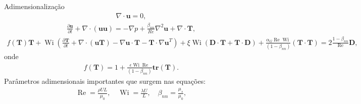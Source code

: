 \begin{frame}{Adimensionalização}
\begin{equation}
    \begin{split}
        \nabla \cdot \mathbf{u} = 0,
    \end{split}\label{eq_conservacao_massa_admensional}
\end{equation}
\begin{equation}
    \begin{split}
        \frac{\partial \mathbf{u}}{\partial t} + \nabla \cdot (\mathbf{uu}) = -\nabla p + \frac{\beta_{nn}}{Re} \nabla^2 \mathbf{u} + \nabla \cdot \mathbf{T},
\end{split}\label{eq_conservacao_momentum_nao_newtoniano_admensional}
\end{equation}
\small{
\begin{equation}
    \begin{split}
        f(\mathbf{T})\mathbf{T} + \operatorname{Wi} \left( \frac{\partial \mathbf{T}}{\partial t} + \nabla \cdot (\mathbf{u T}) - \nabla \mathbf{u} \cdot \mathbf{T} - \mathbf{T} \cdot \nabla \mathbf{u}^T \right) + \xi \operatorname{Wi} \left( \mathbf{D} \cdot \mathbf{T} + \mathbf{T} \cdot\mathbf{D}\right) + \frac{\alpha_G \operatorname{Re} \operatorname{Wi}}{(1 - \beta_{nn})} (\mathbf{T} \cdot \mathbf{T}) = 2 \frac{1 - \beta_{nn}}{\operatorname{Re}} \mathbf{D},
    \end{split}\label{eq_tensores_lpog_admensional}
\end{equation}}
\normalsize
onde
\begin{equation*}
    \begin{split}
        f(\mathbf{T}) = 1+\frac{\epsilon \operatorname{Wi} \operatorname{Re}}{(1 - \beta_{nn})}\textbf{tr}(\mathbf{T}).
    \end{split}\label{eq_funcao_traco_tensor}
\end{equation*}
Parâmetros adimensionais importantes que surgem nas equações:
\begin{align*}
    \operatorname{Re} = \frac{\rho U L}{\mu_0},\quad \operatorname{Wi} = \frac{\lambda U}{L},\quad \beta_{nn} = \frac{\mu_s}{\mu_0},
\end{align*}
\end{frame}

